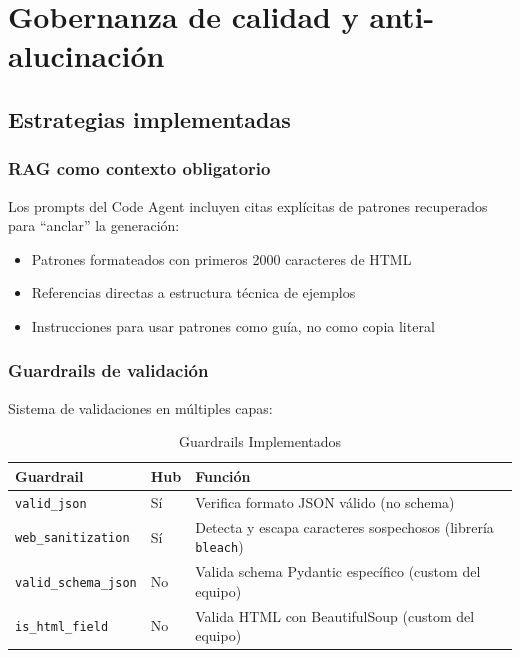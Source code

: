 \documentclass[12pt,a4paper]{article}
\begin{document}
\section{Gobernanza de calidad y anti-alucinación}

\subsection{Estrategias implementadas}

\subsubsection{RAG como contexto obligatorio}

Los prompts del Code Agent incluyen citas explícitas de patrones recuperados para ``anclar'' la generación:

\begin{itemize}
    \item Patrones formateados con primeros 2000 caracteres de HTML
    \item Referencias directas a estructura técnica de ejemplos
    \item Instrucciones para usar patrones como guía, no como copia literal
\end{itemize}

\subsubsection{Guardrails de validación}

Sistema de validaciones en múltiples capas:

\begin{table}[H]
\centering
\caption{Guardrails Implementados}
\begin{tabular}{llp{5cm}}
\toprule
\textbf{Guardrail} & \textbf{Hub} & \textbf{Función} \\
\midrule
\texttt{valid\_json} & Sí & Verifica formato JSON válido (no schema) \\
\texttt{web\_sanitization} & Sí & Detecta y escapa caracteres sospechosos (librería \texttt{bleach}) \\
\texttt{valid\_schema\_json} & No & Valida schema Pydantic específico (custom del equipo) \\
\texttt{is\_html\_field} & No & Valida HTML con BeautifulSoup (custom del equipo) \\
\bottomrule
\end{tabular}
\end{table}
\end{document}
